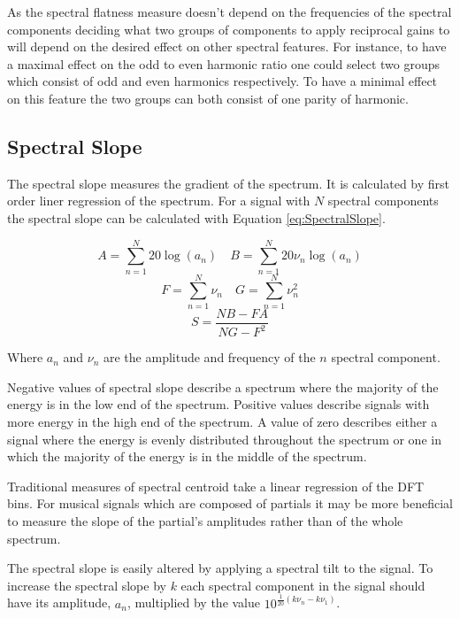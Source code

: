 			As the spectral flatness measure doesn't depend on the frequencies of the spectral components
			deciding what two groups of components to apply reciprocal gains to will depend on the desired
			effect on other spectral features. For instance, to have a maximal effect on the odd to even
			harmonic ratio one could select two groups which consist of odd and even harmonics respectively. To
			have a minimal effect on this feature the two groups can both consist of one parity of harmonic.

	\subsection{Spectral Slope}
	\label{sec:FeatureControl-Parameterisation-Slope}
		The spectral slope measures the gradient of the spectrum. It is calculated by first order liner regression
		of the spectrum. For a signal with $N$ spectral components the spectral slope can be calculated with
		Equation \ref{eq:SpectralSlope}.

		\[ A = \sum_{n = 1}^{N} 20\log (a_{n}) \quad B = \sum_{n = 1}^{N} 20\nu_{n}\log (a_{n}) \]
		\[ F = \sum_{n = 1}^{N} \nu_{n} \quad G = \sum_{n = 1}^{N} \nu_{n}^{2} \]
		\begin{equation}
			S = \frac{NB - FA}
		                 {NG - F^{2}}
			\label{eq:SpectralSlope}
		\end{equation}

		Where $a_{n}$ and $\nu_{n}$ are the amplitude and frequency of the $n$ spectral component.

		Negative values of spectral slope describe a spectrum where the majority of the energy is in the low end of
		the spectrum. Positive values describe signals with more energy in the high end of the spectrum. A value of
		zero describes either a signal where the energy is evenly distributed throughout the spectrum or one in
		which the majority of the energy is in the middle of the spectrum.

		Traditional measures of spectral centroid take a linear regression of the DFT bins. For musical signals
		which are composed of partials it may be more beneficial to measure the slope of the partial's amplitudes
		rather than of the whole spectrum. 
		
		The spectral slope is easily altered by applying a spectral tilt to the signal. To increase the spectral
		slope by $k$ each spectral component in the signal should have its amplitude, $a_{n}$, multiplied by the
		value $10^{\frac{1}{20}(k\nu_{n} - k\nu_{1})}$.

